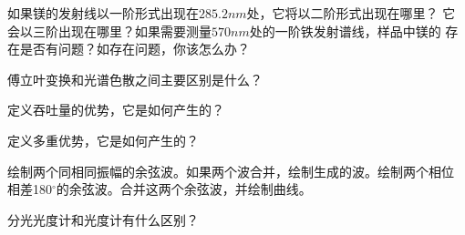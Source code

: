 \begin{problemset}
\item 如果镁的发射线以一阶形式出现在$285.2 nm$处，它将以二阶形式出现在哪里？
    它会以三阶出现在哪里？如果需要测量$570 nm$处的一阶铁发射谱线，样品中镁的
    存在是否有问题？如存在问题，你该怎么办？
\item 傅立叶变换和光谱色散之间主要区别是什么？
\item 定义吞吐量的优势，它是如何产生的？
\item 定义多重优势，它是如何产生的？
\item 绘制两个同相同振幅的余弦波。如果两个波合并，绘制生成的波。绘制两个相位
    相差180$^\circ$的余弦波。合并这两个余弦波，并绘制曲线。
\item 分光光度计和光度计有什么区别？

\end{problemset}

